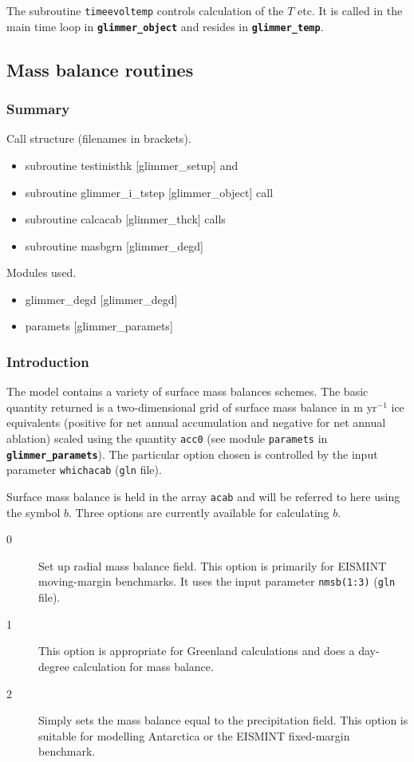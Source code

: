 The subroutine \texttt{timeevoltemp} controls calculation of the
$T$ etc. It is called in the main time loop in
\textbf{\texttt{glimmer\_object}} and resides in
\textbf{\texttt{glimmer\_temp}}.

\subsection{Mass balance routines}

\subsubsection{Summary}
Call structure (filenames in brackets).
\begin{itemize}
    \item subroutine testinisthk [glimmer\_setup] and
    \item subroutine glimmer\_i\_tstep [glimmer\_object] call
    \item subroutine calcacab [glimmer\_thck] calls
    \item subroutine masbgrn [glimmer\_degd]
\end{itemize}

\noindent Modules used.
\begin{itemize}
    \item glimmer\_degd [glimmer\_degd]
    \item paramets [glimmer\_paramets]
\end{itemize}

\subsubsection{Introduction} The model contains a variety of surface
mass balances schemes. The basic quantity returned is a
two-dimensional grid of surface mass balance in m yr$^{-1}$ ice
equivalents (positive for net annual accumulation and negative for
net annual ablation) scaled using the quantity \texttt{acc0} (see
module \texttt{paramets} in \textbf{\texttt{glimmer\_paramets}}).
The particular option chosen is controlled by the input parameter
\texttt{whichacab} (\texttt{gln} file).

Surface mass balance is held in the array \texttt{acab} and will
be referred to here using the symbol $b$. Three options are
currently available for calculating $b$.

\begin{description}
    \item[0] Set up radial mass balance field.  This option is
    primarily for EISMINT moving-margin benchmarks.  It uses the input
    parameter \texttt{nmsb(1:3)} (\texttt{gln} file).
    \item[1] This option is appropriate for Greenland calculations
    and does a day-degree calculation for mass balance.
    \item[2] Simply sets the mass balance equal to the
    precipitation field.  This option is suitable for modelling
    Antarctica or the EISMINT fixed-margin benchmark.
\end{description}

